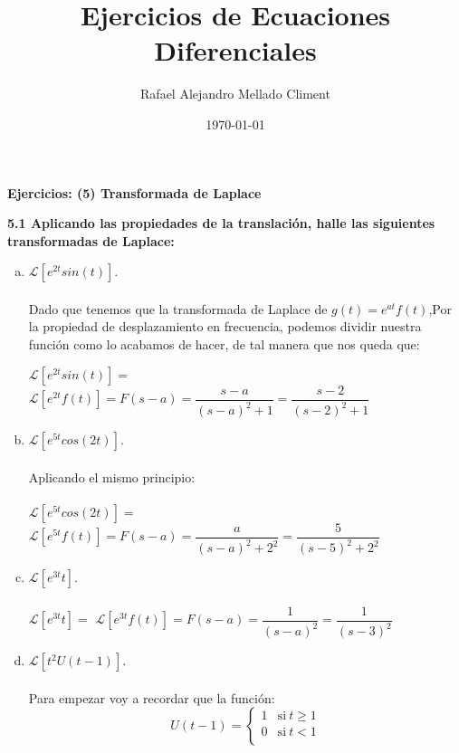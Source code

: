 \documentclass[11pt]{article}
\def\Laplace#1{\mathscr{L}}%
\begin{document}
\title{Ejercicios de Ecuaciones Diferenciales}
\author{Rafael Alejandro Mellado Climent}
\date{\today}
\maketitle
\pagebreak 
\begin{center}
\textbf{Ejercicios: (5) Transformada de Laplace}
\end{center}

\textbf{5.1 Aplicando las propiedades de la translación, halle las siguientes transformadas de Laplace:}
\begin{enumerate}[(a)]
\item \large{$\Laplace\left[e^{2t}sin(t)].$} 
\\ \\
Dado que tenemos que la transformada de Laplace de $g(t)=e^{at}f(t)$,Por la propiedad de desplazamiento en frecuencia, podemos dividir nuestra función como lo acabamos de hacer, de tal manera que nos queda que:


$\Laplace\left[e^{2t}sin(t)]=$ $\Laplace\left[e^{2t}f(t)]=F(s-a)=\dfrac{s-a}{(s-a)^2+1}=\dfrac{s-2}{(s-2)^2+1}$
\\
\item $\Laplace\left[e^{5t}cos(2t)].$
\\ \\
Aplicando el mismo principio:
\\
\\
$\Laplace\left[e^{5t}cos(2t)]=$ $\Laplace\left[e^{5t}f(t)]=F(s-a)=\dfrac{a}{(s-a)^2+2^2}=\dfrac{5}{(s-5)^2+2^2}$
\item $\Laplace\left[e^{3t}t].$
\\ \\
$\Laplace\left[e^{3t}t]=$ $\Laplace\left[e^{3t}f(t)]=F(s-a)=\dfrac{1}{(s-a)^2}=\dfrac{1}{(s-3)^2}$
\item $\Laplace\left[t^2U(t-1)].$
\\ \\
Para empezar voy a recordar que la función:
\begin{equation}
     \label{eq:como-hacerle-la-llave-grande}
     U(t-1) = \left\{
	       \begin{array}{ll}
		 1      & \mathrm{si\ }  t\geq 1\\
		 0 & \mathrm{si\ } t  < 1 \\
		

\end{array}
\end{equation}
\end{enumerate}
\end{document}
